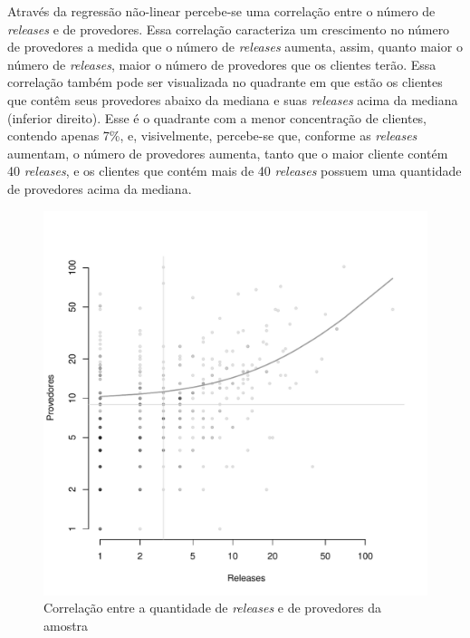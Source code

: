 Através da regressão não-linear percebe-se uma correlação entre o número de \textit{releases} e de provedores. Essa correlação caracteriza um crescimento no número de provedores a medida que o número de \textit{releases} aumenta, assim, quanto maior o número de \textit{releases}, maior o número de provedores que os clientes terão. Essa correlação também pode ser visualizada no quadrante em que estão os clientes que contêm seus provedores abaixo da mediana e suas \textit{releases} acima da mediana (inferior direito). Esse é o quadrante com a menor concentração de clientes, contendo apenas 7\%, e, visivelmente, percebe-se que, conforme as \textit{releases} aumentam, o número de provedores aumenta, tanto que o maior cliente contém 40 \textit{releases}, e os clientes que contém mais de 40 \textit{releases} possuem uma quantidade de provedores acima da mediana.

\begin{figure}
    \centering
    \includegraphics[scale=0.6]{figuras/correlation_release_providers.pdf}
    \caption{Correlação entre a quantidade de \textit{releases} e de provedores da amostra}
    \label{fig:correlation_release_providers}
\end{figure}{}

